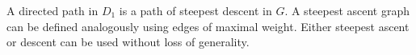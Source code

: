 \documentclass{article}\usepackage{times}
\begin{document}
A directed path in $D_1$ is a path of steepest descent in $G$.  A
steepest ascent graph can be defined analogously using edges of
maximal weight. Either steepest ascent or descent can be used without
loss of generality.

\begin{figure}
  \centering
  \\

\end{figure}
\end{document}
